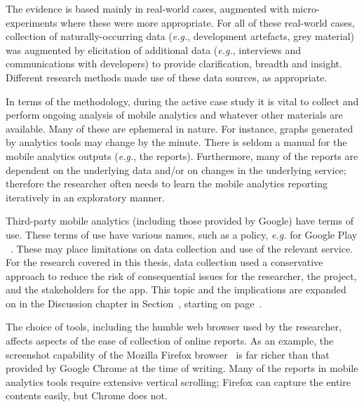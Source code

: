 The evidence is based mainly in real-world cases, augmented with micro-experiments where these were more appropriate. For all of these real-world cases, collection of naturally-occurring data (\textit{e.g.}, development artefacts, grey material) was augmented by elicitation of additional data (\textit{e.g.}, interviews and communications with developers) to provide clarification, breadth and insight.  Different research methods made use of these data sources, as appropriate.

In terms of the methodology, during the active case study it is vital to collect and perform ongoing analysis of mobile analytics and whatever other materials are available. Many of these are ephemeral in nature. For instance, graphs generated by analytics tools may change by the minute. There is seldom a manual for the mobile analytics outputs (\textit{e.g.}, the reports). Furthermore, many of the reports are dependent on the underlying data and/or on changes in the underlying service; therefore the researcher often needs to learn the mobile analytics reporting iteratively in an exploratory manner.


Third-party mobile analytics (including those provided by Google) have terms of use. These terms of use have various names, such as a policy, \textit{e.g.} for Google Play ~. These may place limitations on data collection and use of the relevant service. For the research covered in this thesis, data collection used a conservative approach to reduce the risk of consequential issues for the researcher, the project, and the stakeholders for the app. This topic and the implications are expanded on in the Discussion chapter in Section~, starting on page~\pageref{discussion-on-methodology-and-case-study-procedure}.

The choice of tools, including the humble web browser used by the researcher, affects aspects of the ease of collection of online reports. As an example, the screenshot capability of the Mozilla Firefox browser~ is far richer than that provided by Google Chrome at the time of writing. Many of the reports in mobile analytics tools require extensive vertical scrolling; Firefox can capture the entire contents easily, but Chrome does not. 

